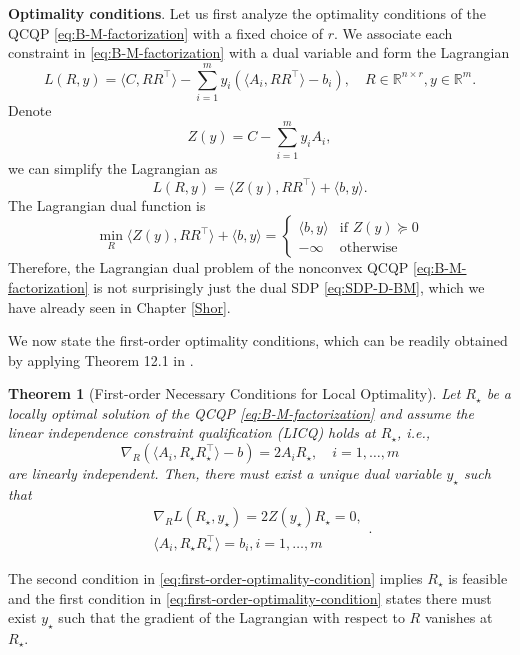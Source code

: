 \documentclass[
]{book}
\newtheorem{theorem}{Theorem}[chapter]
\theoremstyle{definition}
\theoremstyle{definition}
\theoremstyle{definition}
\theoremstyle{definition}
\theoremstyle{remark}
\begin{document}
\textbf{Optimality conditions}. Let us first analyze the optimality conditions of the QCQP \eqref{eq:B-M-factorization} with a fixed choice of \(r\). We associate each constraint in \eqref{eq:B-M-factorization} with a dual variable and form the Lagrangian
\[
L(R,y) = \langle C, RR^\top \rangle - \sum_{i=1}^m y_i \left( \langle A_i, RR^\top \rangle - b_i \right), \quad R \in \mathbb{R}^{n \times r}, y \in \mathbb{R}^{m}.
\]
Denote
\begin{equation}
Z(y) = C - \sum_{i=1}^m y_i A_i,
\label{eq:Zofy}
\end{equation}
we can simplify the Lagrangian as
\[
L(R,y) = \langle Z(y), RR^\top \rangle + \langle b, y \rangle.
\]
The Lagrangian dual function is
\[
\min_R \langle Z(y), RR^\top \rangle + \langle b, y \rangle = \begin{cases}
\langle b, y \rangle & \text{if }Z(y) \succeq 0 \\
-\infty & \text{otherwise}
\end{cases}
\]
Therefore, the Lagrangian dual problem of the nonconvex QCQP \eqref{eq:B-M-factorization} is not surprisingly just the dual SDP \eqref{eq:SDP-D-BM}, which we have already seen in Chapter \ref{Shor}.

We now state the first-order optimality conditions, which can be readily obtained by applying Theorem 12.1 in \citep{nocedal99book-numerical}.

\begin{theorem}[First-order Necessary Conditions for Local Optimality]
\protect\hypertarget{thm:FirstOrderOptimality}{}\label{thm:FirstOrderOptimality}Let \(R_\star\) be a locally optimal solution of the QCQP \eqref{eq:B-M-factorization} and assume the linear
independence constraint qualification (LICQ) holds at \(R_\star\), i.e.,
\[
\nabla_{R} (\langle A_i, R_\star R_\star^\top \rangle - b) = 2A_i R_\star, \quad i=1,\dots,m
\]
are linearly independent. Then, there must exist a unique dual variable \(y_\star\) such that
\begin{equation}
\begin{split}
\nabla_{R} L(R_\star, y_\star) = 2 Z(y_\star) R_\star = 0, \\
\langle A_i, R_\star R_\star^\top \rangle = b_i, i=1,\dots,m
\end{split}.
\label{eq:first-order-optimality-condition}
\end{equation}
\end{theorem}

The second condition in \eqref{eq:first-order-optimality-condition} implies \(R_\star\) is feasible and the first condition in \eqref{eq:first-order-optimality-condition} states there must exist \(y_\star\) such that the gradient of the Lagrangian with respect to \(R\) vanishes at \(R_\star\).
\end{document}
